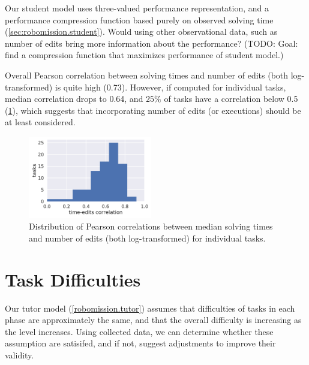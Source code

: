 Our student model uses three-valued performance representation, and
a performance compression function based purely on observed solving time
(\cref{sec:robomission.student}).
Would using other observational data, such as number of edits
bring more information about the performance?
(TODO: Goal: find a compression function that maximizes performance of
student model.)

Overall Pearson correlation between solving times and number of edits (both
log-transformed) is quite high (0.73). However, if computed for individual tasks,
median correlation drops to 0.64, %
and $25\%$ of tasks have a correlation below 0.5 %
(\cref{fig:time-vs-edits}), which suggests that incorporating number of edits
(or executions) should be at least considered.


\begin{figure}[htb]
\centering
\includegraphics[width=0.48\textwidth]{img/time-edits-corr}
\caption{%
  Distribution of Pearson correlations between median solving times and number
  of edits (both log-transformed) for individual tasks.} %
\label{fig:time-vs-edits}
\end{figure}


\section{Task Difficulties}


Our tutor model (\cref{robomission.tutor}) assumes that difficulties of tasks
in each phase are approximately the same,
and that the overall difficulty is increasing as the level increases.   %
Using collected data, we can determine whether these assumption are satisifed,
and if not, suggest adjustments to improve their validity.

